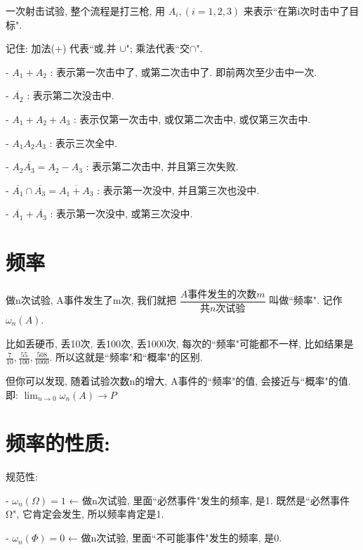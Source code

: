\documentclass[UTF8]{ctexart}
\begin{document}
\begin{myEnvSample}
	一次射击试验, 整个流程是打三枪, 用 $A_i, (i=1,2,3)$ 来表示``在第i次时击中了目标".
	
	记住: 加法(+) 代表``或,并 $\cup$"; 乘法代表``交$\cap$".
	
	- $A_1+A_2$ : 表示第一次击中了, 或第二次击中了. 即前两次至少击中一次.
	
	- $	\overline{A_2}	$ : 表示第二次没击中.
	
	- $	A_1+A_2+A_3	$ : 表示仅第一次击中, 或仅第二次击中, 或仅第三次击中.
	
	- $	A_1A_2A_3	$ : 表示三次全中.
	
	- $	A_2\overline{A_3} = A_2 - A_3	$ : 表示第二次击中, 并且第三次失败.
	
	- $	\overline{A_1}\cap \overline{A_3}=\overline{A_1+A_3}$ : 表示第一次没中, 并且第三次也没中.
	
	- $	\overline{A_1}+\overline{A_3}	$ : 表示第一次没中, 或第三次没中.


\end{myEnvSample}



\section{频率}

做n次试验, A事件发生了m次, 我们就把 $\dfrac{A\text{事件发生的次数}m}{\text{共}n\text{次试验}}$ 叫做``频率". 记作$\omega _n\left( A \right) $.

比如丢硬币, 丢10次, 丢100次, 丢1000次, 每次的``频率"可能都不一样, 比如结果是 $\frac{7}{10},\frac{55}{100},\frac{508}{1000} $. 所以这就是``频率"和``概率"的区别.

但你可以发现, 随着试验次数n的增大, A事件的``频率"的值, 会接近与``概率"的值. 即: $ \lim_{n→0}\omega _n\left( A \right)  \to P $


\section{频率的性质:}

规范性: 

- $\omega _n\left( \varOmega \right) =1$ ← 做n次试验, 里面``必然事件"发生的频率, 是1.  
既然是``必然事件Ω", 它肯定会发生, 所以频率肯定是1.


- $\omega _n\left( \varPhi \right) =0$ ← 做n次试验, 里面``不可能事件"发生的频率, 是0. \\
\end{document}
